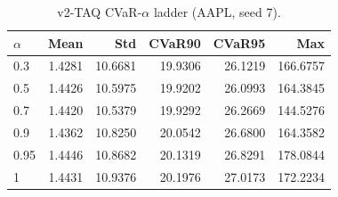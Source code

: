 \begin{table}[H]
    \centering
    \caption{v2-TAQ CVaR-$\alpha$ ladder (AAPL, seed 7).}
    \label{tab:v2_taq_alpha}
    \begin{tabular}{@{}lrrrrr@{}}
        \toprule
        $\alpha$ & Mean & Std & CVaR90 & CVaR95 & Max \\
        \midrule
        0.3 & 1.4281 & 10.6681 & 19.9306 & 26.1219 & 166.6757 \\
        0.5 & 1.4426 & 10.5975 & 19.9202 & 26.0993 & 164.3845 \\
        0.7 & 1.4420 & 10.5379 & 19.9292 & 26.2669 & 144.5276 \\
        0.9 & 1.4362 & 10.8250 & 20.0542 & 26.6800 & 164.3582 \\
        0.95 & 1.4446 & 10.8682 & 20.1319 & 26.8291 & 178.0844 \\
        1 & 1.4431 & 10.9376 & 20.1976 & 27.0173 & 172.2234 \\
        \bottomrule
    \end{tabular}
\end{table}
